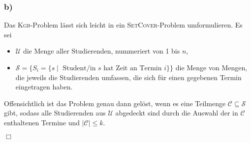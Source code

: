 \documentclass{article}
\begin{document}
\subsubsection{b)}

Das \textsc{Kgb}-Problem lässt sich leicht in ein \textsc{SetCover}-Problem
umformulieren. Es sei
\begin{itemize}[label=$\circ$]
   \item $\mathcal{U}$ die Menge aller Studierenden, nummeriert von 1 bis $n$,
   \item $\mathcal{S} = \{S_i = \{ s \mid \text{ Student/in $s$ hat Zeit an
      Termin $i$}\}\}$ die Menge von Mengen, die jeweils die Studierenden umfassen,
      die sich für einen gegebenen Termin eingetragen haben.
\end{itemize}

Offensichtlich ist das Problem genau dann gelöst, wenn es eine Teilmenge
$\mathcal{C} \subseteq \mathcal{S}$ gibt, sodass alle Studierenden aus
$\mathcal{U}$ abgedeckt sind durch die Auswahl der in $\mathcal{C}$ enthaltenen
Termine und $|\mathcal{C}| \le k$.

\hfill{}$\Box$
\end{document}
